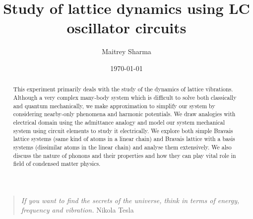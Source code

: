 \documentclass[%
 aip,
 amsmath,amssymb,
 reprint, floatfix%
]{revtex4-1}
\begin{document}

\title[Study of lattice dynamics using LC oscillator circuits]{Study of lattice dynamics using LC oscillator circuits}
\author{Maitrey Sharma}

\date{\today}%

\begin{abstract}
This experiment primarily deals with the study of the dynamics of lattice vibrations. Although a very complex many-body system which is difficult to solve both classically and quantum mechanically, we make approximation to simplify our system by considering nearby-only phenomena and harmonic potentials. We draw analogies with electrical domain using the admittance analogy and model our system mechanical system using circuit elements to study it electrically. We explore both simple Bravais lattice systems (same kind of atoms in a linear chain) and Bravais lattice with a basis systems (dissimilar atoms in the linear chain) and analyse them extensively. We also discuss the nature of phonons and their properties and how they can play vital role in field of condensed matter physics.
\end{abstract}

\maketitle 


\begin{quotation}
\textit{If you want to find the secrets of the universe, think in terms of energy, frequency and vibration.}
\newline
\hspace*{0pt}\hfill Nikola Tesla
\end{quotation}
\end{document}
